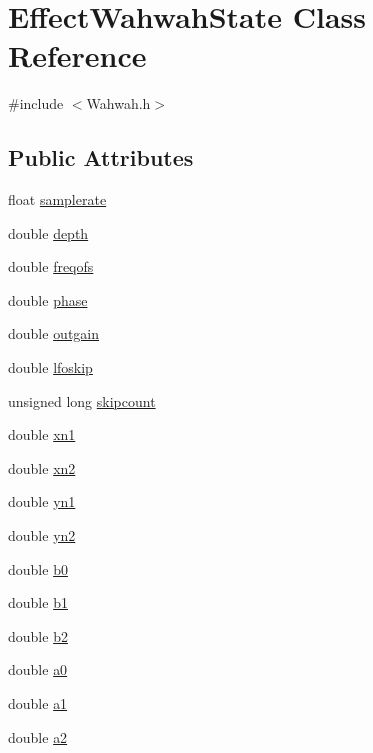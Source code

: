 \hypertarget{class_effect_wahwah_state}{}\section{Effect\+Wahwah\+State Class Reference}
\label{class_effect_wahwah_state}


{\ttfamily \#include $<$Wahwah.\+h$>$}

\subsection*{Public Attributes}
\begin{DoxyCompactItemize}
\item 
float \hyperlink{class_effect_wahwah_state_a415edbbbddab085862aa62f439c115dc}{samplerate}
\item 
double \hyperlink{class_effect_wahwah_state_ac296631285e0b098e548e8415530374e}{depth}
\item 
double \hyperlink{class_effect_wahwah_state_a0c342b9ceee58149e5148a34ff1d50ca}{freqofs}
\item 
double \hyperlink{class_effect_wahwah_state_a7a6f038090e6edbed001bbf70c43b2a9}{phase}
\item 
double \hyperlink{class_effect_wahwah_state_a6dbd45874a0bd6b33ac49a4d22938d1c}{outgain}
\item 
double \hyperlink{class_effect_wahwah_state_aee4c957a0bad04f5c955fc7959b6c758}{lfoskip}
\item 
unsigned long \hyperlink{class_effect_wahwah_state_a516ca82df0ae182449dadfcebfe47a24}{skipcount}
\item 
double \hyperlink{class_effect_wahwah_state_a7422c0cf0ba0b15b36635f9b84aaf13a}{xn1}
\item 
double \hyperlink{class_effect_wahwah_state_a1352e9e3234be9589439d20a8ee3b639}{xn2}
\item 
double \hyperlink{class_effect_wahwah_state_a65da4693cd2f45328665e651447dd0e5}{yn1}
\item 
double \hyperlink{class_effect_wahwah_state_a0752d59300e29e0370df5aa3ea93667c}{yn2}
\item 
double \hyperlink{class_effect_wahwah_state_a6047202695f62805b82f4f9adc880fdc}{b0}
\item 
double \hyperlink{class_effect_wahwah_state_a2d7c3d4f06c52d44f2c9dee6be278af6}{b1}
\item 
double \hyperlink{class_effect_wahwah_state_a48f60ec328aaa607252b1ffcf6bcb370}{b2}
\item 
double \hyperlink{class_effect_wahwah_state_a5dccfe5ba10622327dfddfc2640a95c7}{a0}
\item 
double \hyperlink{class_effect_wahwah_state_a09e52dce2462501cf72cb1c10fa7c11d}{a1}
\item 
double \hyperlink{class_effect_wahwah_state_a51b7d95c0c611b72df5610229ce6c5bf}{a2}
\end{DoxyCompactItemize}


